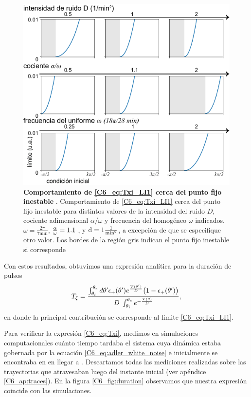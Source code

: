 \documentclass[./main.tex]{subfiles}
\begin{document}
\begin{figure}
    \centering
    \includegraphics[width=1\columnwidth]{figures/chapter6/C6_limite_int_2.pdf} 
    \caption{\textbf{Comportamiento de \ref{C6_eq:Txi_LI1} cerca del punto fijo inestable \xxi}. Comportamiento de \ref{C6_eq:Txi_LI1} cerca del punto fijo inestable \xxi para distintos valores de la intensidad del ruido $D$, cociente adimensional $\alpha/\omega$ y frecuencia del homogéneo $\omega$ indicados. $\omega = \frac{2\pi}{7 \text{min}}$, $\frac{\alpha}{\omega} = 1.1$ , y $\mathrm{d} = 1 \frac{1}{\text{min}^2}$, a excepción de que se especifique otro valor. Los bordes de la región gris indican el punto fijo inestable si corresponde}
    \label{C6_fig:Txi_LI2_S2}
\end{figure}

Con estos resultados, obtuvimos una expresión analítica para la duración de pulsos
\begin{align}
     T_\xi = \frac{\int_{\theta_i}^{\theta_e} d \theta' \epsilon_{+}(\theta') e^{ \frac{V(\theta')}{D}} \big(1 - \epsilon_{+}(\theta') \big)}{D\; \int_{\theta_i}^{\theta_e} e^{- \frac{V(\theta)}{D}}},
     \label{C6_eq:Txi}
\end{align}
en donde la principal contribución se corresponde al limite \ref{C6_eq:Txi_LI1}.

Para verificar la expresión \ref{C6_eq:Txi}, medimos en simulaciones computacionales cuánto tiempo tardaba el sistema cuya dinámica estaba gobernada por la ecuación \ref{C6_eq:adler_white_noise} e inicialmente se encontraba en \xxi en llegar a \xxe. Descartamos todas las mediciones realizadas sobre las trayectorias que atravesaban \xxi luego del instante inicial (ver apéndice \ref{C6_ap:traces}). En la figura \ref{C6_fig:duration} observamos que nuestra expresión coincide con las simulaciones. 
\end{document}
